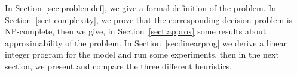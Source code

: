 In Section~\ref{sec:problemdef}, we give a formal definition of the problem. In Section~\ref{sect:complexity}, we prove that the corresponding decision problem is NP-complete, then we give, in Section~\ref{sect:approx} some results about approximability of the problem. In Section~\ref{sec:linearprog} we derive a linear integer program for the model and run some experiments, then in the next section, we present and compare the three different heuristics.
